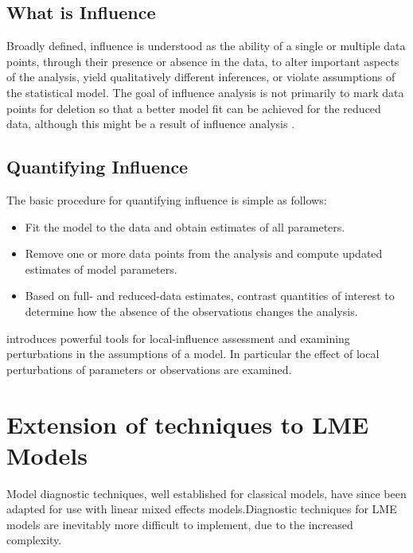 \documentclass[12pt, a4paper]{report}
\theoremstyle{plain}
\theoremstyle{definition}
\theoremstyle{remark}
\begin{document}
\subsection{What is Influence} %

Broadly defined, influence is understood as the ability of a single or multiple data points, through their presence or absence in the data, to alter important aspects of the analysis, yield qualitatively different inferences, or violate assumptions of the statistical model. The goal of influence analysis is not primarily to mark data
points for deletion so that a better model fit can be achieved for the reduced data, although this might be a result of influence analysis \citep{schabenberger}.

\subsection{Quantifying Influence}  %

The basic procedure for quantifying influence is simple as follows:

\begin{itemize}
\item Fit the model to the data and obtain estimates of all parameters.
\item Remove one or more data points from the analysis and compute updated estimates of model parameters.
\item Based on full- and reduced-data estimates, contrast quantities of interest to determine how the absence of the observations changes the analysis.
\end{itemize}

\citet{cook86} introduces powerful tools for local-influence assessment and examining perturbations in the assumptions of a model. In particular the effect of local perturbations of parameters or observations are examined.


\newpage
\section{Extension of techniques to LME Models} %

Model diagnostic techniques, well established for classical models, have since been adapted for use with linear mixed effects models.Diagnostic techniques for LME models are inevitably more difficult to implement, due to the increased complexity.
\end{document}
